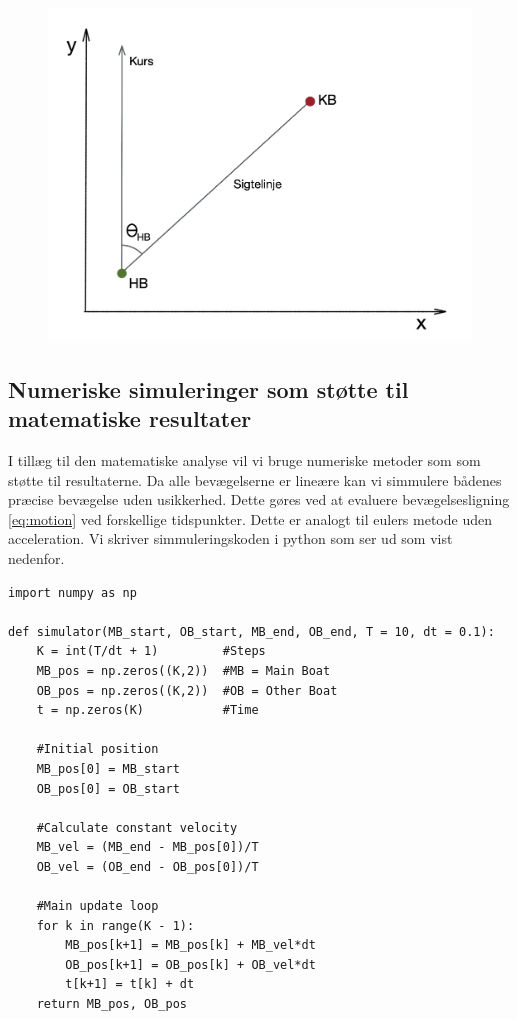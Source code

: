 \documentclass[%
 reprint,
nofootinbib,
aps,
]{revtex4-1}
\begin{document}
\begin{figure}
  \includegraphics[width=\linewidth]{figures/metode_tegning.png}
  \caption{}
  \label{fig:metode_tegning}
\end{figure}

\subsection{Numeriske simuleringer som støtte til matematiske resultater}
I tillæg til den matematiske analyse vil vi bruge numeriske metoder som som støtte til resultaterne. Da alle bevægelserne er lineære kan vi simmulere bådenes præcise bevægelse uden usikkerhed. Dette gøres ved at evaluere bevægelsesligning \ref{eq:motion} ved forskellige tidspunkter. Dette er analogt til eulers metode uden acceleration. Vi skriver simmuleringskoden i python som ser ud som vist nedenfor.

\begin{verbatim}
import numpy as np

def simulator(MB_start, OB_start, MB_end, OB_end, T = 10, dt = 0.1):
    K = int(T/dt + 1)         #Steps
    MB_pos = np.zeros((K,2))  #MB = Main Boat
    OB_pos = np.zeros((K,2))  #OB = Other Boat
    t = np.zeros(K)           #Time

    #Initial position
    MB_pos[0] = MB_start
    OB_pos[0] = OB_start

    #Calculate constant velocity
    MB_vel = (MB_end - MB_pos[0])/T
    OB_vel = (OB_end - OB_pos[0])/T

    #Main update loop
    for k in range(K - 1):
        MB_pos[k+1] = MB_pos[k] + MB_vel*dt
        OB_pos[k+1] = OB_pos[k] + OB_vel*dt
        t[k+1] = t[k] + dt
    return MB_pos, OB_pos
\end{verbatim}
\end{document}
